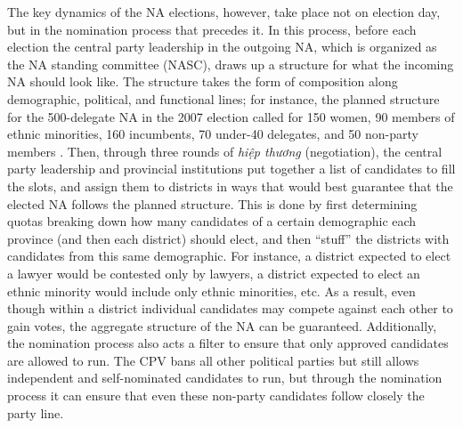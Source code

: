\documentclass[12pt]{article}\usepackage[]{graphicx}\usepackage[]{color}
\newcommand{\1}{\mathbbm{1}}
\begin{document}
The key dynamics of the NA elections, however, take place not on election day, but in the nomination process that precedes it. In this process, before each election the central party leadership in the outgoing NA, which is organized as the NA standing committee (NASC), draws up a structure for what the incoming NA should look like. The structure takes the form of composition along demographic, political, and functional lines; for instance, the planned structure for the 500-delegate NA in the 2007 election called for 150 women, 90 members of ethnic minorities, 160 incumbents, 70 under-40 delegates, and 50 non-party members  \citep[506]{MaleskySchuler2011}. Then, through three rounds of \textit{hiệp thương} (negotiation), the central party leadership and provincial institutions put together a list of candidates to fill the slots, and assign them to districts in ways that would best guarantee that the elected NA follows the planned structure. This is done by first determining quotas breaking down how many candidates of a certain demographic each province (and then each district) should elect, and then ``stuff'' the districts with candidates from this same demographic. For instance, a district expected to elect a lawyer would be contested only by lawyers, a district expected to elect an ethnic minority would include only ethnic minorities, etc. As a result, even though within a district individual candidates may compete against each other to gain votes, the aggregate structure of the NA can be guaranteed. Additionally, the nomination process also acts a filter to ensure that only approved candidates are allowed to run. The CPV bans all other political parties but still allows independent and self-nominated candidates to run, but through the nomination process it can ensure that even these non-party candidates follow closely the party line.
\end{document}
